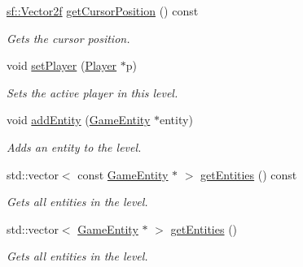 \begin{DoxyCompactItemize}
\mbox{\hyperlink{classsf_1_1_vector2}{sf\+::\+Vector2f}} \mbox{\hyperlink{class_game_level_ad00de55f4d3eb9f923997efb8f75e3fb}{get\+Cursor\+Position}} () const
\begin{DoxyCompactList}\small\item\em Gets the cursor position. \end{DoxyCompactList}\item 
\mbox{\label{class_game_level_af73af3b9a49c30aa448c3c077d0bf75b}} 
void \mbox{\hyperlink{class_game_level_af73af3b9a49c30aa448c3c077d0bf75b}{set\+Player}} (\mbox{\hyperlink{class_player}{Player}} $\ast$p)
\begin{DoxyCompactList}\small\item\em Sets the active player in this level. \end{DoxyCompactList}\item 
\mbox{\label{class_game_level_a0e69ade991238875e5187841fc0fed59}} 
void \mbox{\hyperlink{class_game_level_a0e69ade991238875e5187841fc0fed59}{add\+Entity}} (\mbox{\hyperlink{class_game_entity}{Game\+Entity}} $\ast$entity)
\begin{DoxyCompactList}\small\item\em Adds an entity to the level. \end{DoxyCompactList}\item 
\mbox{\label{class_game_level_a507320391022a981782556586280c3d6}} 
std\+::vector$<$ const \mbox{\hyperlink{class_game_entity}{Game\+Entity}} $\ast$ $>$ \mbox{\hyperlink{class_game_level_a507320391022a981782556586280c3d6}{get\+Entities}} () const
\begin{DoxyCompactList}\small\item\em Gets all entities in the level. \end{DoxyCompactList}\item 
\mbox{\label{class_game_level_aa8b8b3b312e98797cda28a9971d7f254}} 
std\+::vector$<$ \mbox{\hyperlink{class_game_entity}{Game\+Entity}} $\ast$ $>$ \mbox{\hyperlink{class_game_level_aa8b8b3b312e98797cda28a9971d7f254}{get\+Entities}} ()
\begin{DoxyCompactList}\small\item\em Gets all entities in the level. \end{DoxyCompactList}\item 

\end{DoxyCompactItemize}
